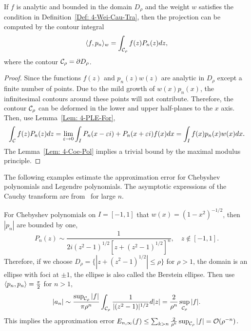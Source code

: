 \begin{lemma}
\label{Lem: 4-Coe-Pol}
    If $f$ is analytic and bounded in the domain $D_{\rho}$ and the weight $w$ satisfies the condition in Definition~\ref{Def: 4-Wei-Cau-Tra}, 
    then the projection can be computed by the contour integral
    \begin{equation}
        \langle {f, p_n} \rangle_w = \int_{\mathcal C_{\rho}} f(z) P_n(z) dz,
    \end{equation}
    where the contour $\mathcal C_{\rho} = \partial D_{\rho}$.
\end{lemma}
\begin{proof}
    Since the functions $f(z)$ and $p_n(z) w(z)$ are analytic in $D_{\rho}$ except a finite number of points. Due to the mild growth of $w(x)p_n(x)$, the infinitesimal contours around these points will not contribute. Therefore, the contour $\mathcal C_{\rho}$ can be deformed in the lower and upper half-planes to the $x$ axis. Then, use Lemma~\ref{Lem: 4-PLE-For}, 
    \begin{equation}
         \int_{\mathcal C} f(z) P_n(z) dz = \lim_{\varepsilon\to 0} \int_{I}  P_n(x - \varepsilon i) + P_n(x + \varepsilon i) f(x) dx = \int_{I} f(x) p_n(x) w(x) dx. 
    \end{equation}
    The Lemma~\ref{Lem: 4-Coe-Pol} implies a trivial bound by the maximal modulus principle.
\end{proof}
The following examples estimate the approximation error for Chebyshev polynomials and Legendre polynomials. The asymptotic expressions of the Cauchy transform are from~\cite{elliott1974asymptotic} for large $n$.  
\begin{example}
    For Chebyshev polynomials on $I = [-1,1]$ that $w(x) = (1 - x^2)^{-1/2}$, then $|p_n|$ are bounded by one,  
    \begin{equation}
        P_n(z) \sim \frac{1}{2i (z^2 - 1)^{1/2} [z + (z^2 - 1)^{1/2}]^n},\quad z \notin [-1, 1].
    \end{equation}
    Therefore, if we choose $D_{\rho} = \{|z + (z^2 - 1)^{1/2}| \le \rho\}$ for $\rho > 1$, the domain is an ellipse with foci at $\pm 1$, the ellipse is also called the Berstein ellipse. Then use $\langle {p_n, p_n} \rangle = \frac{\pi}{2}$ for $n > 1$, 
    \begin{equation}
        |a_n| \sim \frac{\sup_{\mathcal C_{\rho}} |f|}{\pi \rho^n } \int_{\mathcal C_{\rho}} \frac{1}{|(z^2 - 1)|^{1/2}} d|z| = \frac{2}{\rho^n} \sup_{\mathcal C_{\rho}} |f|.
    \end{equation}
    This implies the approximation error $E_{n,\infty}(f) \le \sum_{k > n} \frac{2}{\rho^k} \sup_{\mathcal C_{\rho}} |f| = \mathcal O(\rho^{-n})$.
\end{example}
